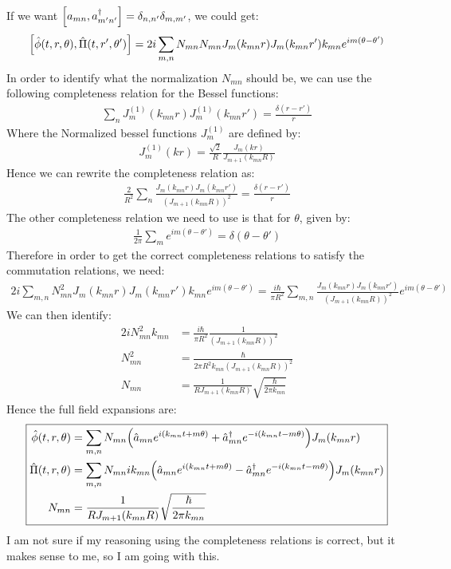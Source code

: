 \documentclass[12pt]{article}
\begin{document}
If we want $\comm{a_{mn}}{a_{m'n'}^\dag}=\delta_{n,n'}\delta_{m,m'}$, we could get:
\begin{align*}
  \comm{\hat\phi(t,r,\theta)}{\hat\Pi(t,r',\theta')}=
  2i\sum_{m,n}N_{mn}N_{mn}J_{m}(k_{mn}r)J_{m}(k_{mn}r')k_{mn}
  e^{im(\theta-\theta')}
\end{align*}
In order to identify what the normalization $N_{mn}$ should be, we can use the following completeness relation for the Bessel functions:
\begin{align*}
  \sum_{n}J^{(1)}_m(k_{mn}r)J^{(1)}_m(k_{mn}r')=\frac{\delta(r-r')}{r}
\end{align*}
Where the Normalized bessel functions $J_m^{(1)}$ are defined by:
\begin{align*}
  J^{(1)}_m(kr)=\frac{\sqrt{2}}{R}\frac{J_m(kr)}{J_{m+1}(k_{mn}R)}
\end{align*}
Hence we can rewrite the completeness relation as:
\begin{align*}
  \frac{2}{R^2}\sum_{n}\frac{J_m(k_{mn}r)J_m(k_{mn}r')}{(J_{m+1}(k_{mn}R))^2}
  =\frac{\delta(r-r')}{r}
\end{align*}
The other completeness relation we need to use is that for $\theta$, given by:
\begin{align*}
  \frac1{2\pi}\sum_me^{im(\theta-\theta')}=\delta(\theta-\theta')
\end{align*}
Therefore in order to get the correct completeness relations to satisfy the commutation relations, we need:
\begin{align*}
  2i\sum_{m,n}N_{mn}^2J_{m}(k_{mn}r)J_{m}(k_{mn}r')k_{mn}
  e^{im(\theta-\theta')}=\frac{i\hbar}{\pi R^2}
  \sum_{m,n}\frac{J_m(k_{mn}r)J_m(k_{mn}r')}{(J_{m+1}(k_{mn}R))^2}
  e^{im(\theta-\theta')}
\end{align*}
We can then identify:
\begin{align*}
  2iN_{mn}^2k_{mn}&=\frac{i\hbar}{\pi R^2}\frac1{(J_{m+1}(k_{mn}R))^2}\\
  N_{mn}^2&=\frac\hbar{2\pi R^2k_{mn}(J_{m+1}(k_{mn}R))^2}\\
  N_{mn}&=\frac1{R J_{m+1}(k_{mn}R)}\sqrt{\frac{\hbar}{2\pi k_{mn}}}
\end{align*}
Hence the full field expansions are:
\begin{equation}
  \boxed{\begin{aligned}
      \hat\phi(t,r,\theta)&=\sum_{m,n}N_{mn}\qty(
      \hat{a}_{mn}e^{i(k_{mn}t+m\theta)}+\hat{a}^\dag_{mn}e^{-i(k_{mn}t-m\theta)})
      J_m(k_{mn}r)\\
      \hat\Pi(t,r,\theta)&=\sum_{m,n}N_{mn}ik_{mn}\qty(
      \hat{a}_{mn}e^{i(k_{mn}t+m\theta)}-\hat{a}^\dag_{mn}e^{-i(k_{mn}t-m\theta)})
      J_m(k_{mn}r)\\
      N_{mn}&=\frac1{R J_{m+1}(k_{mn}R)}\sqrt{\frac{\hbar}{2\pi k_{mn}}}
    \end{aligned}}
\end{equation}
I am not sure if my reasoning using the completeness relations is correct, but it makes sense to me, so I am going with this.
\end{document}
